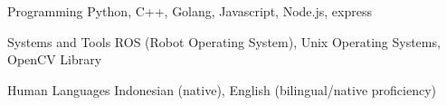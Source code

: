 

\begin{cvskills}

  \cvskill
    {Programming} %
    {Python, C++, Golang, Javascript, Node.js, express} %

  \cvskill
    {Systems and Tools} %
    {ROS (Robot Operating System), Unix Operating Systems, OpenCV Library} %

  \cvskill
    {Human Languages} %
    {Indonesian (native), English (bilingual/native proficiency)} %

\end{cvskills}
